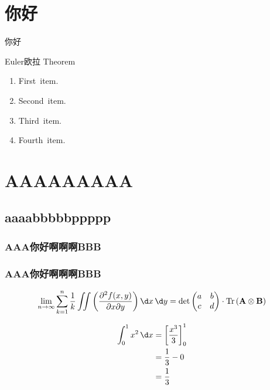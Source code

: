 \documentclass[10pt]{mycls}
\begin{document}
\chapter{你好}
    你好
    \zhlipsum*[1]
    \begin{mybox}[colframe=cyan]{Euler欧拉 Theorem}
        \begin{enumerate}
            \item First~item.
            \item Second~item.
            \item Third~item.
            \item Fourth~item.
        \end{enumerate}
        \zhlipsum*[3]
    \end{mybox}
    \zhlipsum*[1-3]
    
\chapter{AAAAAAAAA}
\section{aaaabbbbbppppp}
\zhlipsum*[1]

\subsection{AAA你好啊啊啊BBB}
\zhlipsum*[1]

\zhlipsum*[3]

\subsection{AAA你好啊啊啊BBB}

\zhlipsum*[1]

\[ 
\lim_{n \to \infty} \sum_{k=1}^{n} \frac{1}{k} \iint
\left( \frac{\partial^{2} f(x,y)}{\partial x \partial y} \right) \d x \, \d y 
= \det \begin{pmatrix} a & b \\ c & d \end{pmatrix} 
\cdot \operatorname{Tr} \left( \mathbf{A} \otimes \mathbf{B} \right)
\]

\zhlipsum[2]
\begin{align}
\int_{0}^{1} x^{2} \, \d x 
&= \left[ \frac{x^{3}}{3} \right]_{0}^{1} \\
&= \frac{1}{3} - 0 \\
&= \frac{1}{3}
\end{align}
\end{document}
